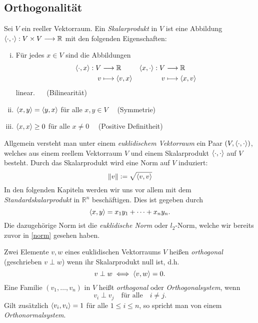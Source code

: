 \subsection{Orthogonalität}
\begin{defn}
Sei $V$ ein reeller Vektorraum. Ein \textit{Skalarprodukt} in $V$ ist eine Abbildung $\langle \cdot, \cdot \rangle: V \times V \longrightarrow \mathbb{R}$ mit den folgenden Eigenschaften:
\begin{enumerate}[(i)]
\item Für jedes $x \in V$ sind die Abbildungen
\begin{align*}
\langle \cdot, x \rangle: V & \longrightarrow \mathbb{R} & \langle x, \cdot \rangle: V & \longrightarrow \mathbb{R}\\
v & \longmapsto \langle v, x \rangle & v & \longmapsto \langle x, v \rangle
\end{align*}
linear. $\quad$ (Bilinearität)
\item $\langle x, y \rangle = \langle y, x \rangle$ für alle  $x,y \in V \quad$ (Symmetrie)
\item $\langle x, x \rangle \geq 0$ für alle $x \neq 0 \quad$ (Positive Definitheit)
\end{enumerate}
\end{defn}

Allgemein versteht man unter einem \textit{euklidischem Vektorraum} ein Paar $(V, \langle \cdot, \cdot \rangle)$, welches aus einem reellem Vektorraum $V$ und einem Skalarprodukt $\langle \cdot, \cdot \rangle$ auf $V$ besteht. Durch das Skalarprodukt wird eine Norm auf $V$ induziert:
$$\left\lVert v \right\rVert \vcentcolon= \sqrt{\langle v, v \rangle}$$
In den folgenden Kapiteln werden wir uns vor allem mit dem \textit{Standardskalarprodukt} in $\mathbb{R}^n$ beschäftigen. Dies ist gegeben durch 
$$\langle x, y \rangle = x_1y_1 + \cdots + x_ny_n.$$
Die dazugehörige Norm ist die \textit{euklidische Norm} oder $l_2$-Norm, welche wir bereits zuvor in \ref{norm} gesehen haben.

\begin{defn}
Zwei Elemente $v,w$ eines euklidischen Vektorraums $V$ heißen \textit{orthogonal} (geschrieben $v \perp w$) wenn ihr Skalarprodukt null ist, d.h.
$$v \perp w \iff \langle v, w \rangle = 0.$$
Eine Familie $(v_1, \ldots, v_n)$ in $V$ heißt \textit{orthogonal} oder \textit{Orthogonalsystem}, wenn
$$v_i \perp v_j \quad \text{für alle} \quad i \neq j.$$
Gilt zusätzlich $\langle v_i, v_i \rangle = 1$ für alle $1 \leq i \leq n$, so spricht man von einem \textit{Orthonormalsystem}.
\end{defn}

